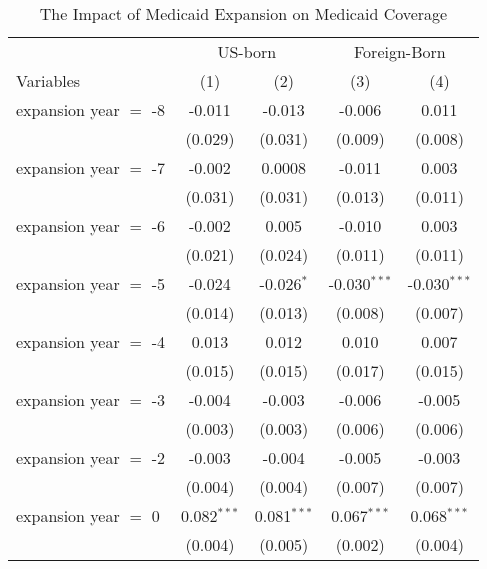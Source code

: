 \documentclass[
]{article}
\begin{document}
\begin{table}[htbp]
   \caption{The Impact of Medicaid Expansion on Medicaid Coverage }
   \centering
   \small
   \begin{tabular}{lcccc}
      \tabularnewline \midrule \midrule
       & \multicolumn{2}{c}{US-born} & \multicolumn{2}{c}{Foreign-Born} \\ \cmidrule(lr){2-3} \cmidrule(lr){4-5}
      Variables             & (1)           & (2)           & (3)            & (4)\\  
      \midrule 
      expansion year $=$ -8 & -0.011        & -0.013        & -0.006         & 0.011\\   
                            & (0.029)       & (0.031)       & (0.009)        & (0.008)\\   
      expansion year $=$ -7 & -0.002        & 0.0008        & -0.011         & 0.003\\   
                            & (0.031)       & (0.031)       & (0.013)        & (0.011)\\   
      expansion year $=$ -6 & -0.002        & 0.005         & -0.010         & 0.003\\   
                            & (0.021)       & (0.024)       & (0.011)        & (0.011)\\   
      expansion year $=$ -5 & -0.024        & -0.026$^{*}$  & -0.030$^{***}$ & -0.030$^{***}$\\   
                            & (0.014)       & (0.013)       & (0.008)        & (0.007)\\   
      expansion year $=$ -4 & 0.013         & 0.012         & 0.010          & 0.007\\   
                            & (0.015)       & (0.015)       & (0.017)        & (0.015)\\   
      expansion year $=$ -3 & -0.004        & -0.003        & -0.006         & -0.005\\   
                            & (0.003)       & (0.003)       & (0.006)        & (0.006)\\   
      expansion year $=$ -2 & -0.003        & -0.004        & -0.005         & -0.003\\   
                            & (0.004)       & (0.004)       & (0.007)        & (0.007)\\   
      expansion year $=$ 0  & 0.082$^{***}$ & 0.081$^{***}$ & 0.067$^{***}$  & 0.068$^{***}$\\   
                            & (0.004)       & (0.005)       & (0.002)        & (0.004)\\   

\end{tabular}
\end{table}
\end{document}

